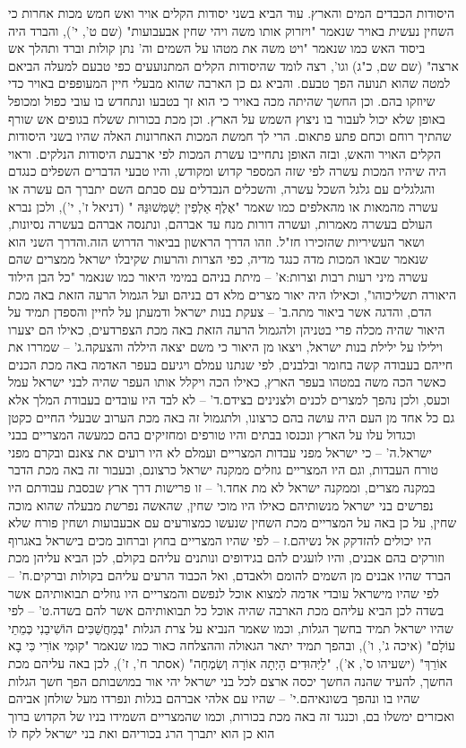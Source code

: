 \documentclass[12pt, openany]{book}
\begin{document}
היסודות הכבדים המים והארץ. עוד הביא בשני יסודות הקלים אויר ואש חמש מכות אחרות  כי השחין נעשית באויר שנאמר "ויזרוק אותו משה ויהי שחין אבעבועות" (שם ט', י'), והברד היה ביסוד האש כמו שנאמר "ויט משה את מטהו על השמים וה' נתן קולות וברד ותהלך אש ארצה" (שם שם, כ"ג) וגו', רצה לומד שהיסודות הקלים המתנועעים כפי טבעם למעלה הביאם למטה שהוא תנועה הפך טבעם. והביא גם כן הארבה שהוא מבעלי חיין המעופפים באויר כדי שיוזקו בהם. וכן החשך שהיתה מכה באויר כי הוא זך בטבעו ונתחדש בו עובי כפול ומכופל באופן שלא יכול לעבור בו ניצוץ השמש על הארץ. וכן מכת בכורות ששלח בגופים אש שורף שהתיך רוחם וכחם פתע פתאום. הרי לך חמשת המכות האחרונות האלה שהיו בשני היסודות הקלים האויר והאש, ובזה האופן נתחייבו עשרת המכות לפי ארבעת היסודות הנלקים. וראוי היה שיהיו המכות עשרה לפי שזה המספר קדוש ומקודש, והיו טבעי הדברים השפלים כנגדם והגלגלים עם גלגל השכל עשרה, והשכלים הנבדלים עם סבתם השם יתברך הם עשרה או עשרה מהמאות או מהאלפים כמו שאמר "אֶלֶף  אַלְפִין יְשַׁמְּשׁוּנֵּהּ " (דניאל ז', י'), ולכן נברא העולם בעשרה מאמרות, ועשרה דורות מנח עד אברהם, ונתנסה אברהם בעשרה נסיונות, ושאר העשיריות שהזכירו חז"ל. וזהו הדרך הראשון בביאור הדרוש הזה.והדרך השני הוא שנאמר שבאו המכות מדה כנגד מדיה, כפי הצרות והרעות שקיבלו ישראל ממצרים שהם עשרה מיני רעות רבות וצרות:א' – מיתת בניהם במימי היאור כמו שנאמר "כל הבן הילוד היאורה תשליכוהו", וכאילו היה יאור מצרים מלא דם בניהם ועל הגמול הרעה הזאת באה מכת הדם, והדגה אשר ביאור מתה.ב' – צעקת בנות ישראל ודמעתן על לחיין והספדן תמיד על היאור שהיה מכלה פרי בטניהן ולהגמול הרעה הזאת באה מכת הצפרדעים, כאילו הם יצערו וילילו על ילילת בנות ישראל, ויצאו מן היאור כי משם יצאה היללה והצעקה.ג' – שמררו את חייהם בעבודה קשה בחומר ובלבנים, לפי שנתנו עמלם ויגיעם בעפר האדמה באה מכת הכנים כאשר הכה משה במטהו בעפר הארץ, כאילו הכה ויקלל אותו העפר שהיה לבני ישראל עמל וכעס, ולכן נהפך למצרים לכנים ולצנינים בצידם.ד' – לא לבד היו עובדים בעבודת המלך אלא גם כל אחד מן העם היה עושה בהם כרצונו, ולתגמול זה באה מכת הערוב שבעלי החיים כקטן וכגדול עלו על הארץ ונכנסו בבתים והיו טורפים ומחזיקים בהם כמעשה המצריים בבני ישראל.ה' – כי ישראל מפני עבדות המצריים ועמלם לא היו רועים את צאנם ובקרם מפני טורח העבדות, וגם היו המצריים גוזלים ממקנה ישראל כרצונם, ובעבור זה באה מכת הדבר במקנה מצרים, וממקנה ישראל לא מת אחד.ו' – זו פרישות דרך ארץ שבסבת עבודתם היו נפרשים בני ישראל מנשותיהם כאילו היו מוכי שחין, שהאשה נפרשת מבעלה שהוא מוכה שחין, על כן באה על המצריים מכת השחין שנעשו כמצורעים עם אבעבועות ושחין פורח שלא היו יכולים להזדקק אל נשיהם.ז – לפי שהיו המצריים בחוץ וברחוב מכים בישראל באגרוף וזורקים בהם אבנים, והיו לועגים להם בגידופים ונותנים עליהם בקולם, לכן הביא עליהן מכת הברד שהיו אבנים מן השמים להומם ולאבדם, ואל הכבוד הרעים עליהם בקולות וברקים.ח' – לפי שהיו מישראל עובדי אדמה למצוא אוכל לנפשם והמצריים היו גוזלים תבואותיהם אשר בשדה לכן הביא עליהם מכת הארבה שהיה אוכל כל תבואותיהם אשר להם בשדה.ט' – לפי שהיו ישראל תמיד בחשך הגלות, וכמו שאמר הנביא על צרת הגלות "בְּמַחֲשַׁכִּים הוֹשִׁיבַנִי כְּמֵתֵי עוֹלָם" (איכה ג', ו'), ובהפך תמיד יתאר הגאולה וההצלחה כאור כמו שנאמר "קוּמִי אוֹרִי כִּי בָא אוֹרֵךְ" (ישעיהו ס', א'), "לַיְּהוּדִים הָיְתָה אוֹרָה וְשִׂמְחָה" (אסתר ח', ז'), לכן באה עליהם מכת החשך, להעיד שהנה החשך יכסה ארצם לכל בני ישראל יהי אור במושבותם הפך חשך הגלות שהיו בו ונהפך בשונאיהם.י' – שהיו עם אלהי אברהם בגלות ונפרדו מעל שולחן אביהם ואכזרים ימשלו בם, וכנגד זה באה מכת בכורות, וכמו שהמצריים השמידו בניו של הקדוש ברוך הוא כן הוא יתברך הרג בכוריהם ואת בני ישראל לקח לו 
\end{document}
